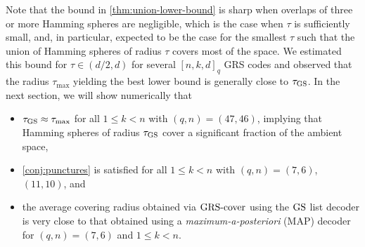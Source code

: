 \documentclass[conference]{IEEEtran}
\begin{document}
Note that the bound in \autoref{thm:union-lower-bound} is sharp when overlaps of three or more Hamming spheres are negligible, which is the case when $\tau$ is sufficiently small, and, in particular, expected to be the case for the smallest $\tau$ such that the union of Hamming spheres of radius $\tau$ covers most of the space. We estimated this bound for $\tau \in (d / 2, d)$ for several $[n, k, d]_{q}$ GRS codes and observed that the radius $\tau_{\max}$ yielding the best lower bound is generally close %
to $\tau_{\operatorname{GS}}$. 
In the next section, we will show numerically that %
\begin{itemize}
    \item $\tau_{\operatorname{GS}} \approx \tau_{\max}$ for all $1 \le k < n$ with $(q, n) = (47, 46)$, 
    implying that Hamming spheres of radius $\tau_{\operatorname{GS}}$ cover a significant fraction of the ambient space,
    \item \autoref{conj:punctures} is satisfied for all $1 \le k < n$ with $(q, n) = (7, 6)$, $(11, 10)$, %
    and
    \item the average covering radius obtained via $\operatorname{GRS-cover}$ using the $\operatorname{GS}$ list decoder is very close to that obtained using a \emph{maximum-a-posteriori} (MAP) decoder for $(q, n) = (7, 6)$ and $1 \le k < n$.
\end{itemize}
\end{document}
